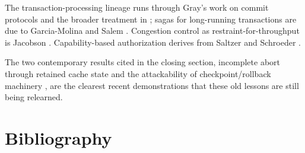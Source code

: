 \documentclass[11pt]{book}
\begin{document}
The transaction-processing lineage runs through Gray's work on commit protocols \cite{gray1978notes} and the broader treatment in \cite{gray1992transaction}; sagas for long-running transactions are due to Garcia-Molina and Salem \cite{garciamolina1987sagas}. Congestion control as restraint-for-throughput is Jacobson \cite{jacobson1988congestion}. Capability-based authorization derives from Saltzer and Schroeder \cite{saltzer1975protection}.

The two contemporary results cited in the closing section, incomplete abort through retained cache state \cite{abortedkv2026} and the attackability of checkpoint/rollback machinery \cite{saferesume2026}, are the clearest recent demonstrations that these old lessons are still being relearned.

\section*{Bibliography}
\end{document}
